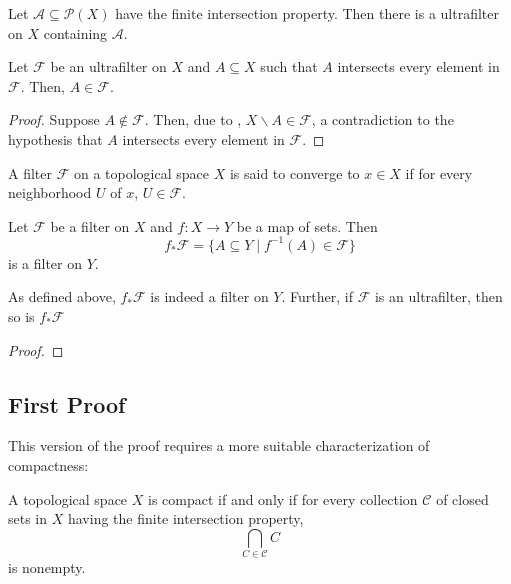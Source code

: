 \begin{corollary}
    Let $\mathscr A\subseteq\mathcal P(X)$ have the finite intersection property. Then there is a ultrafilter on $X$ containing $\mathscr A$.
\end{corollary}

\begin{proposition}
    Let $\mathcal F$ be an ultrafilter on $X$ and $A\subseteq X$ such that $A$ intersects every element in $\mathcal F$. Then, $A\in\mathcal F$.
\end{proposition}
\begin{proof}
    Suppose $A\notin\mathcal F$. Then, due to , $X\backslash A\in\mathcal F$, a contradiction to the hypothesis that $A$ intersects every element in $\mathcal F$.
\end{proof}

\begin{definition}
    A filter $\mathcal F$ on a topological space $X$ is said to converge to $x\in X$ if for every neighborhood $U$ of $x$, $U\in\mathcal F$.
\end{definition}

\begin{definition}[Pushforward]
    Let $\mathcal F$ be a filter on $X$ and $f: X\to Y$ be a map of sets. Then 
    \begin{equation*}
        f_*\mathcal F = \{A\subseteq Y\mid f^{-1}(A)\in\mathcal F\}
    \end{equation*}
    is a filter on $Y$.
\end{definition}

\begin{theorem}
    As defined above, $f_*\mathcal F$ is indeed a filter on $Y$. Further, if $\mathcal F$ is an ultrafilter, then so is $f_*\mathcal F$
\end{theorem}
\begin{proof}
    
\end{proof}

\subsection{First Proof}

This version of the proof requires a more suitable characterization of compactness: 

\begin{theorem}
    A topological space $X$ is compact if and only if for every collection $\mathscr C$ of closed sets in $X$ having the finite intersection property, 
    \begin{equation*}
        \bigcap_{C\in\mathscr C} C
    \end{equation*}
    is nonempty.
\end{theorem}

